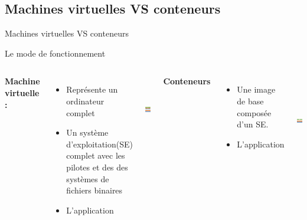 \documentclass{beamer}
\begin{document}
\subsection*{Machines virtuelles VS conteneurs}
\begin{frame}{Machines virtuelles VS conteneurs}
    \begin{center}  Le mode de fonctionnement \end{center}
    \begin{columns}
        \textbf{ Machine virtuelle :} 
        \begin{itemize}
            \item Représente un ordinateur complet 
            \item Un système d’exploitation(SE) complet avec les pilotes et des des systèmes de fichiers binaires
            \item L’application
        \end{itemize}
            \begin{center}
           \includegraphics[width=35mm,height=30mm]{VM.png}
            \end{center}
        \textbf{Conteneurs}
        \begin{itemize}
            \item Une image de base composée d’un SE.
            \item L'application
        \end{itemize}
            \begin{center}
                \includegraphics[width=35mm,height=40mm]{Conteneures.png}
            \end{center}

    \end{columns}

\end{frame}
\end{document}
